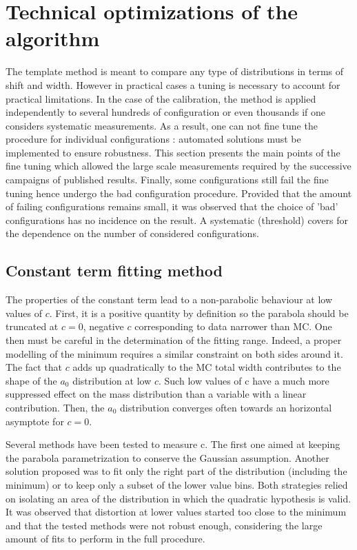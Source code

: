 \section{Technical optimizations of the algorithm}
\label{sec:org87e9766}

The template method  is meant to compare any type of distributions in terms of shift and width.
However in practical cases a tuning is necessary to account for practical limitations.
In the case of the calibration, the method is applied independently to several hundreds of configuration or even thousands if one considers systematic measurements.
As a result, one can not fine tune the procedure for individual configurations : automated solutions must be implemented to ensure robustness.
This section presents the main points of the fine tuning which allowed the large scale measurements required by the successive campaigns of published results.
Finally, some configurations still fail the fine tuning hence undergo the bad configuration procedure.
Provided that the amount of failing configurations remains small, it was observed that the choice of 'bad' configurations has no incidence on the result.
A systematic (threshold) covers for the dependence on the number of considered configurations.


\subsection{Constant term fitting method}
\label{sec:org2159561}
\label{sec:Calibration_inSitu_Tuning_fit}

The properties of the constant term lead to a non-parabolic behaviour at low values of $c$.
First, it is a positive quantity by definition so the parabola should be truncated at $c=0$, negative $c$ corresponding to data narrower than MC.
One then must be careful in the determination of the fitting range.
Indeed, a proper modelling of the minimum requires a similar constraint on both sides around it.
The fact that $c$ adds up quadratically to the MC total width contributes to the shape of the $a_0$ distribution at low $c$.
Such low values of c have a much more suppressed effect on the mass distribution than a variable with a linear contribution.
Then, the $a_0$ distribution converges often towards an horizontal asymptote for $c=0$.

Several methods have been tested to measure c.
The first one aimed at keeping the parabola parametrization to conserve the Gaussian assumption.
Another solution proposed was to fit only the right part of the distribution (including the minimum) or to keep only a subset of the lower value bins.
Both strategies relied on isolating an area of the distribution in which the quadratic hypothesis is valid.
It was observed that distortion at lower values started too close to the minimum and that the tested methods were not robust enough, considering the large amount of fits to perform in the full procedure.

